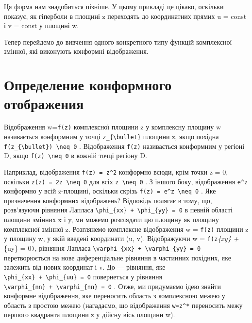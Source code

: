 \documentclass[
  ukrainian,
]{article}
\begin{document}
Ця форма нам знадобиться пізніше. У цьому прикладі це цікаво, оскільки
показує, як гіперболи в площині z переходять до координатних прямих u =
const і v = const у площині w.

Тепер перейдемо до вивчення одного конкретного типу функцій комплексної
змінної, які виконують конформні відображення.

\section{Определение конформного
отображения}\label{ux43eux43fux440ux435ux434ux435ux43bux435ux43dux438ux435-ux43aux43eux43dux444ux43eux440ux43cux43dux43eux433ux43e-ux43eux442ux43eux431ux440ux430ux436ux435ux43dux438ux44f}

Відображення w=\texttt{f(z)} комплексної площини z у комплексну площину
w називається конформним у точці \texttt{z\_\{\textbackslash{}bullet\}}
площини z, якщо похідна
\texttt{f\textquotesingle{}(z\_\{\textbackslash{}bullet\})\ \textbackslash{}neq\ 0}
. Відображення \texttt{f(z)} називається конформним у регіоні D, якщо
\texttt{f\textquotesingle{}(z)\ \textbackslash{}neq\ 0} в кожній точці
регіону D.

Наприклад, відображення \texttt{f(z)\ =\ z\^{}2} конформно всюди, крім
точки z = 0, оскільки
\texttt{z\textquotesingle{}(z)\ =\ 2z\ \textbackslash{}neq\ 0} для всіх
\texttt{z\ \textbackslash{}neq\ 0} . З іншого боку, відображення
\texttt{e\^{}z} конформно у всій z-площині, оскільки скрізь
\texttt{f\textquotesingle{}(z)\ =\ e\^{}z\ \textbackslash{}neq\ 0} . Яке
призначення конформних відображень? Відповідь полягає в тому, що,
розв'язуючи рівняння Лапласа
\texttt{\textbackslash{}phi\_\{xx\}\ +\ \textbackslash{}phi\_\{yy\}\ =\ 0}
в певній області площини змінних x і y, ми можемо розглядати цю площину
як площину комплексної змінної z. Розглянемо комплексне відображення w =
\texttt{f(z)} площини z у площину w, у якій введені координати (u, v).
Відображуючи w = \texttt{f(z}\phi\emph{\{xy\} + \phi}\{uy\} =
0\texttt{)}, рівняння Лапласа
\texttt{\textbackslash{}varphi\_\{xx\}\ +\ \textbackslash{}varphi\_\{yy\}\ =\ 0}
перетворюється на нове диференціальне рівняння в частинних похідних, яке
залежить від нових координат і v. До --- рівняння, яке
\texttt{\textbackslash{}phi\_\{xx\}\ +\ \textbackslash{}phi\_\{uu\}\ =\ 0}
повернеться у рівняння
\texttt{\textbackslash{}varphi\_\{nn\}\ +\ \textbackslash{}varphi\_\{nn\}\ =\ 0}
. Отже, ми придумаємо ідею знайти конформне відображення, яке переносить
область з комплексною межею у область з простою межею (нагадаємо, що
відображення \texttt{w=z\^{}*} переносить межу першого квадранта площини
z у дійсну вісь площини w).
\end{document}
